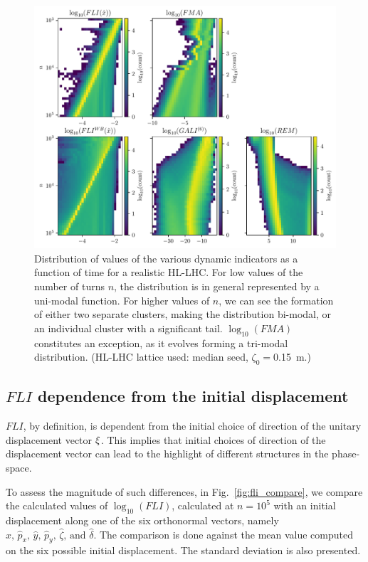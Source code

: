 \begin{figure}
    \centering
    \includegraphics[width=1.0\textwidth]{6_lhc_dynamic_indicators/figs/evolution.pdf}
    \caption{Distribution of values of the various dynamic indicators as a function of time for a realistic HL-LHC. For low values of the number of turns $n$, the distribution is in general represented by a uni-modal function. For higher values of $n$, we can see the formation of either two separate clusters, making the distribution bi-modal, or an individual cluster with a significant tail. $\log_{10}(FMA)$ constitutes an exception, as it evolves forming a tri-modal distribution. (HL-LHC lattice used: median seed, $\zeta_0=$\SI{0.15}{\meter}.)}
    \label{fig:overview2}
\end{figure}

\subsection{$FLI$ dependence from the initial displacement}

$FLI$, by definition, is dependent from the initial choice of direction of the unitary displacement vector $\vb{\xi}$. This implies that initial choices of direction of the displacement vector can lead to the highlight of different structures in the phase-space.

To assess the magnitude of such differences, in Fig.~\ref{fig:fli_compare}, we compare the calculated values of $\log_{10}({FLI})$, calculated at $n=10^5$ with an initial displacement along one of the six orthonormal vectors, namely $\hat{x},\,\hat{p}_x,\,\hat{y},\,\hat{p}_y,\,\hat{\zeta},\,\text{and }\hat{\delta}$. The comparison is done against the mean value computed on the six possible initial displacement. The standard deviation is also presented.


